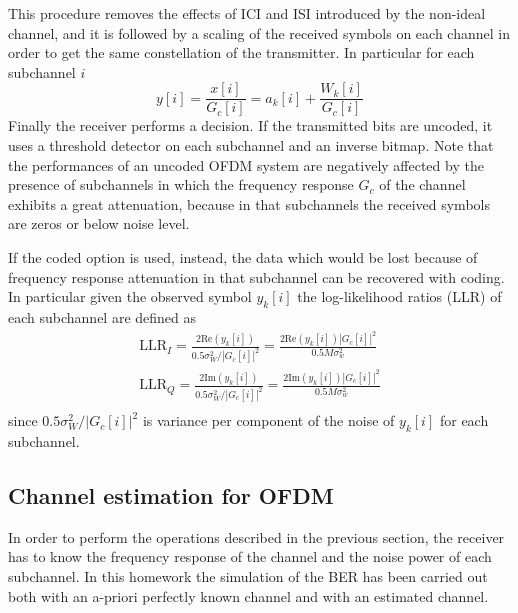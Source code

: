 \documentclass[10pt]{article}
\begin{document}
This procedure removes the effects of ICI and ISI introduced by the non-ideal channel, and it is followed by a scaling of the received symbols on each channel in order to get the same constellation of the transmitter. In particular for each subchannel $i$ 
\begin{equation}
	y[i] = \frac{x[i]}{G_c[i]} = a_k[i] + \frac{W_k[i]}{G_c[i]}
\end{equation}
Finally the receiver performs a decision. If the transmitted bits are uncoded, it uses a threshold detector on each subchannel and an inverse bitmap. Note that the performances of an uncoded OFDM system are negatively affected by the presence of subchannels in which the frequency response $G_c$ of the channel exhibits a great attenuation, because in that subchannels the received symbols are zeros or below noise level. 

If the coded option is used, instead, the data which would be lost because of frequency response attenuation in that subchannel can be recovered with coding. In particular given the observed symbol $y_k[i]$ the log-likelihood ratios (LLR) of each subchannel are defined as
\begin{eqnarray}
	\mathrm{LLR}_I = \frac{2\mathrm{Re}(y_k[i])}{0.5\sigma_W^2/|G_c[i]|^2} = \frac{2\mathrm{Re}(y_k[i]) |G_c[i]|^2 }{0.5 M \sigma_w^2} \\
	\mathrm{LLR}_Q = \frac{2\mathrm{Im}(y_k[i])}{0.5 \sigma_W^2/|G_c[i]|^2} = \frac{2\mathrm{Im}(y_k[i]) |G_c[i]|^2 }{0.5 M \sigma_w^2} \\
\end{eqnarray}
since $0.5 \sigma_W^2/|G_c[i]|^2$ is variance per component of the noise of $y_k[i]$ for each subchannel.

\subsection*{Channel estimation for OFDM}
In order to perform the operations described in the previous section, the receiver has to know the frequency response of the channel and the noise power of each subchannel. In this homework the simulation of the BER has been carried out both with an a-priori perfectly known channel and with an estimated channel. 
\end{document}
